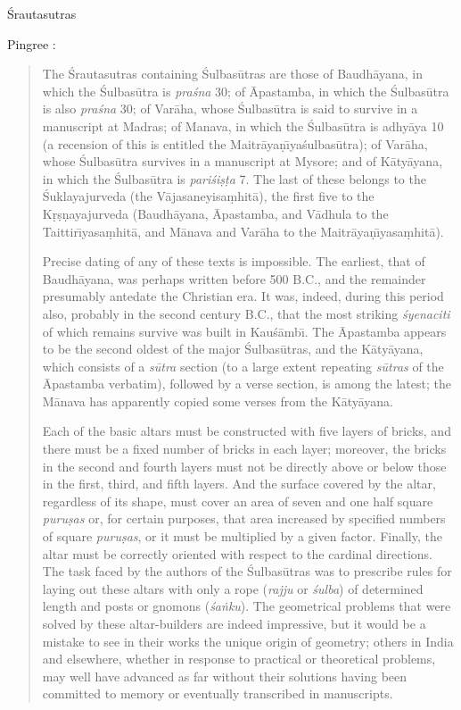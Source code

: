 \documentclass{article}
\begin{document}
\'Srautasutras \cite{kashikarI}

Pingree \cite[pp.~4]{pingree}:

\begin{quote}
The \'Srautasutras containing \'Sulbas\=utras are those of Baudh\=ayana,
 in which
the \'Sulbas\=utra is {\em pra\'sna} 30;
 of \=Apastamba,
 in which the \'Sulbas\=utra is also
{\em pra\'sna} 30;
 of Var\=aha,
 whose \'Sulbas\=utra is said to survive in a manuscript
at Madras;
 of Manava,
 in which the \'Sulbas\=utra is adhy\=aya 10
 (a recension
of this is entitled the Maitr\=aya\d{n}{\=\i}ya\'sulbas\=utra); of Var\=aha,
 whose \'Sulbas\=utra
survives in a manuscript at Mysore;
 and of K\=aty\=ayana,
 in which the \'Sulbas\=utra
is {\em pari\'si\d{s}\d{t}a} 7.
 The last of these belongs to the \'Suklayajurveda (the
V\=ajasaneyisa\d{m}hit\=a), the first five to the K\d{r}\d{s}\d{n}ayajurveda (Baudh\=ayana,
\=Apastamba, and V\=adhula to the Taittir{\=\i}yasa\d{m}hit\=a, and M\=anava and Var\=aha
to the Maitr\=aya\d{n}{\=\i}yasa\d{m}hit\=a).

Precise dating of any of these texts is impossible. The earliest, that of
Baudh\=ayana, was perhaps written before 500 B.C., and the remainder presumably
antedate the Christian era. It was, indeed, during this period also, probably
in the second century B.C., that the most striking {\em \'syenaciti} of which
remains survive was built in Kau\'s\=amb\=\i.
 The \=Apastamba appears to be the
second oldest of the major \'Sulbas\=utras, and the K\=aty\=ayana, which consists of
a {\em s\=utra} section (to a large extent repeating {\em s\=utras} of the \=Apastamba verbatim),
followed by a verse section, is among the latest; the M\=anava has apparently
copied some verses from the K\=aty\=ayana.

Each of the basic altars must be constructed with five layers of bricks, and
there must be a fixed number of bricks in each layer; moreover, the bricks in
the second and fourth layers must not be directly above or below those in the
first, third, and fifth layers. And the surface covered by the altar, regardless
of its shape, must cover an area of seven and one half square {\em puru\d{s}as} or, for
certain purposes, that area increased by specified numbers of square {\em puru\d{s}as},
or it must be multiplied by a given factor. Finally, the altar must be correctly
oriented with respect to the cardinal directions. The task faced by the authors
of the \'Sulbas\=utras was to prescribe rules for laying out these altars with only
a rope ({\em rajju} or {\em \'sulba}) of determined length and posts or gnomons ({\em \'sa\.nku}).
The geometrical problems that were solved by these altar-builders are indeed
impressive, but it would be a mistake to see in their works the unique origin of
geometry;
 others in India and elsewhere, whether in response to practical or
theoretical problems, may well have advanced as far without their solutions
having been committed to memory or eventually transcribed in manuscripts.
\end{quote}
\end{document}
